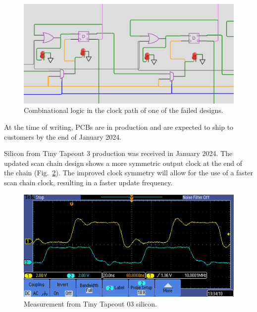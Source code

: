 \begin{figure}[!t]
\centering
\includegraphics[width=\columnwidth]{./Figs/wokwi mux clock logic.png}
\caption{Combinational logic in the clock path of one of the failed designs.}
\label{fig:failed_design_comb_logic}
\end{figure}

At the time of writing, PCBs are in production and are expected to ship to customers by the end of January 2024.

Silicon from Tiny Tapeout 3 production was received in January 2024. The updated scan chain design shows a more symmetric output clock at the end of the chain (Fig.~\ref{fig:TT03_silicon_measurement}). The improved clock symmetry will allow for the use of a faster scan chain clock, resulting in a faster update frequency.

\begin{figure}[!t]
\centering
\includegraphics[width=\columnwidth]{./Figs/tt03_clock_out.png}
\caption{Measurement from Tiny Tapeout 03 silicon.}
\label{fig:TT03_silicon_measurement}
\end{figure}

